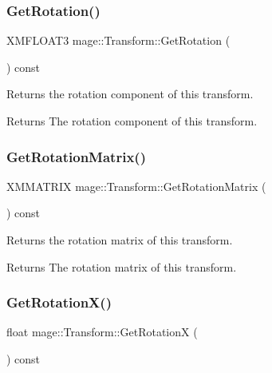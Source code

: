 \subsubsection{\texorpdfstring{Get\+Rotation()}{GetRotation()}}
{\footnotesize\ttfamily X\+M\+F\+L\+O\+A\+T3 mage\+::\+Transform\+::\+Get\+Rotation (\begin{DoxyParamCaption}{ }\end{DoxyParamCaption}) const}

Returns the rotation component of this transform.

\begin{DoxyReturn}{Returns}
The rotation component of this transform. 
\end{DoxyReturn}
\hypertarget{structmage_1_1_transform_a27ca7a5c40ea16c9a885a410b2a1f416}{}\label{structmage_1_1_transform_a27ca7a5c40ea16c9a885a410b2a1f416} 
\subsubsection{\texorpdfstring{Get\+Rotation\+Matrix()}{GetRotationMatrix()}}
{\footnotesize\ttfamily X\+M\+M\+A\+T\+R\+IX mage\+::\+Transform\+::\+Get\+Rotation\+Matrix (\begin{DoxyParamCaption}{ }\end{DoxyParamCaption}) const}

Returns the rotation matrix of this transform.

\begin{DoxyReturn}{Returns}
The rotation matrix of this transform. 
\end{DoxyReturn}
\hypertarget{structmage_1_1_transform_aaaf300a4a24b976c271ba17c8a41beaf}{}\label{structmage_1_1_transform_aaaf300a4a24b976c271ba17c8a41beaf} 
\subsubsection{\texorpdfstring{Get\+Rotation\+X()}{GetRotationX()}}
{\footnotesize\ttfamily float mage\+::\+Transform\+::\+Get\+RotationX (\begin{DoxyParamCaption}{ }\end{DoxyParamCaption}) const}

